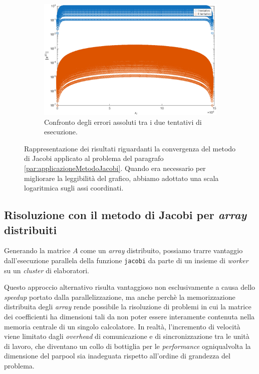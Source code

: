 \begin{figure}[!htbp]
    \vspace{1.5em}

     \begin{subfigure}{0.6\textwidth}
        \centering
        \includegraphics[width=\linewidth]{../Risorse/Capitolo 3/confrontoErroriAssoluti.png}
        \caption{Confronto degli errori assoluti tra i due tentativi di esecuzione.}
        \label{fig:confrontoErroriAssoluti}
    \end{subfigure}
    \caption{Rappresentazione dei risultati riguardanti la convergenza del metodo di Jacobi applicato al problema del paragrafo \ref{par:applicazioneMetodoJacobi}.\newline
    Quando era necessario per migliorare la leggibilit\`a del grafico, abbiamo adottato una scala logaritmica sugli assi coordinati.}
    \label{fig:gruppoImmaginiAnalisiPrestazionale}
\end{figure}
\subsection{Risoluzione con il metodo di Jacobi per \textit{array} distribuiti}
Generando la matrice $A$ come un \textit{array} distribuito, possiamo trarre vantaggio dall'esecuzione parallela della funzione \lstinline{jacobi} da parte 
di un insieme di \textit{worker} su un \textit{cluster} di elaboratori.

Questo approccio alternativo risulta vantaggioso non esclusivamente a causa dello \textit{speedup} portato dalla parallelizzazione, ma anche perch\`e 
la memorizzazione distribuita degli \textit{array} rende possibile la risoluzione di problemi in cui la matrice dei coefficienti ha dimensioni 
tali da non poter essere interamente contenuta nella memoria centrale di un singolo calcolatore.\newline
In realt\`a, l'incremento di velocit\`a viene limitato dagli \textit{overhead} di comunicazione e di sincronizzazione tra le unit\`a di lavoro, che diventano un collo di bottiglia per le \textit{performance} ogniqualvolta la dimensione del parpool sia inadeguata rispetto all'ordine di grandezza del problema.

